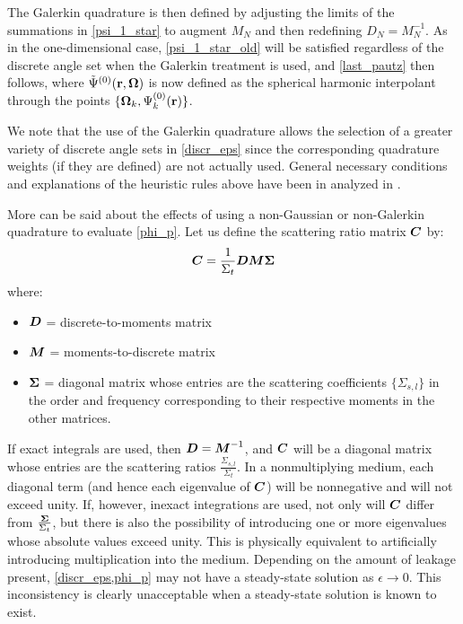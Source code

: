 \begin{description}
The Galerkin quadrature is then defined by adjusting the limits of the
summations in \cref{psi_1_star} to augment $M_N$ and then redefining
$D_N=M_N^{-1}$. As in the one-dimensional case, \cref{psi_1_star_old} will be 
satisfied regardless of the discrete angle set when the Galerkin treatment is 
used, and \cref{last_pautz} then follows, where $\tilde{\Psi}^{(0)}(\mathbf{r},\boldsymbol{\Omega})$ 
is now defined as the spherical harmonic interpolant through the points 
$\{\boldsymbol{\Omega}_k,\Psi_k^{(0)}(\mathbf{r})\}$.

We note that the use of the Galerkin quadrature allows the selection of a
greater variety of discrete angle sets in \cref{discr_eps} since the
corresponding quadrature weights (if they are defined) are not actually used.
General necessary conditions and explanations of the heuristic rules above
have been in analyzed in \cite{galerkin_sanchez}.
\end{description}

More can be said about the effects of using a non-Gaussian or non-Galerkin
quadrature to evaluate \cref{phi_p}. Let us define the scattering
ratio matrix $\boldsymbol{C}$ by:
\begin{equation}
\boldsymbol{C} = \frac{1}{\Sigma_t}\boldsymbol{D}\boldsymbol{M}\boldsymbol{\Sigma}
\end{equation}
where:
\begin{itemize}
\item $\boldsymbol{D}$ = discrete-to-moments matrix
\item $\boldsymbol{M}$ = moments-to-discrete matrix
\item $\boldsymbol{\Sigma}$ = diagonal matrix whose entries are the scattering
coefficients $\{\Sigma_{s,l}\}$ in the order and frequency corresponding to
their respective moments in the other matrices.
\end{itemize}
If exact integrals are used, then $\boldsymbol{D}=\boldsymbol{M}^{-1}$, and $\boldsymbol{C}$ will be a
diagonal matrix whose entries are the scattering ratios
$\frac{\Sigma_{s,l}}{\Sigma_t}$. In a nonmultiplying medium, each diagonal
term (and hence each eigenvalue of $\boldsymbol{C}$) will be nonnegative and will not
exceed unity. If, however, inexact integrations are used, not only will
$\boldsymbol{C}$ differ from $\frac{\boldsymbol{\Sigma}}{\Sigma_t}$, but there is also the
possibility of introducing one or more eigenvalues whose absolute values
exceed unity\cite{pautz_fp,galerkin_morel}. This is physically equivalent 
to artificially introducing multiplication into the medium. Depending on the 
amount of leakage present, \cref{discr_eps,phi_p} may not have a steady-state
solution as $\epsilon\rightarrow 0$. This inconsistency is clearly
unacceptable when a steady-state solution is known to exist.\\

